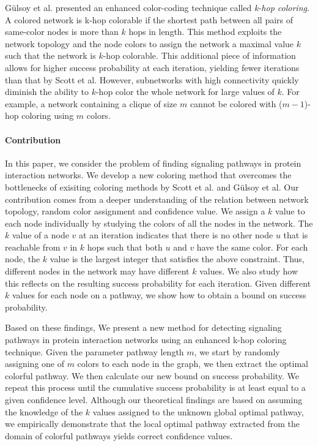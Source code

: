 \documentclass{ws-procs11x85}
\begin{document}
G{\"u}lsoy et al.\cite{gulsoy} presented an enhanced color-coding
technique called \textit{k-hop coloring}. A colored network is k-hop
colorable if the shortest path between all pairs of same-color nodes
is more than $k$ hops in length. This method exploits the network
topology and the node colors to assign the network a maximal value $k$
such that the network is $k$-hop colorable.  This additional piece of
information allows for higher success probability at each iteration,
yielding fewer iterations than that by Scott et al. However,
subnetworks with high connectivity quickly diminish the ability to
$k$-hop color the whole network for large values of $k$. For example,
a network containing a clique of size $m$ cannot be colored with
($m-1$)-hop coloring using $m$ colors\cite{gulsoy}.

\paragraph{Contribution} In this paper, we consider the problem of
finding signaling pathways in protein interaction networks. We develop
a new coloring method that overcomes the bottlenecks of exisiting
coloring methods by Scott et al.\cite{scott} and G{\"u}lsoy et
al\cite{gulsoy}. Our contribution comes from a deeper understanding of
the relation between network topology, random color assignment and
confidence value. We assign a $k$ value to each node individually by
studying the colors of all the nodes in the network. The $k$ value of
a node $v$ at an iteration indicates that there is no other node $u$
that is reachable from $v$ in $k$ hops such that both $u$ and $v$ have
the same color. For each node, the $k$ value is the largest integer
that satisfies the above constraint. Thus, different nodes in the
network may have different $k$ values. We also study how this reflects
on the resulting success probability for each iteration. Given
different $k$ values for each node on a pathway, we show how to obtain
a bound on success probability.

Based on these findings, We present a new method for detecting signaling
pathways in protein interaction networks using an enhanced k-hop coloring
technique. Given the parameter pathway length $m$, we start by randomly
assigning one of $m$ colors to each node in the graph, we then extract the
optimal colorful pathway. We then calculate our new bound on success
probability. We repeat this process until the cumulative success probability is
at least equal to a given confidence level. Although our theoretical findings
are based on assuming the knowledge of the $k$ values assigned to the unknown
global optimal pathway, we empirically demonstrate that the local optimal
pathway extracted from the domain of colorful pathways yields correct
confidence values.
\end{document}
